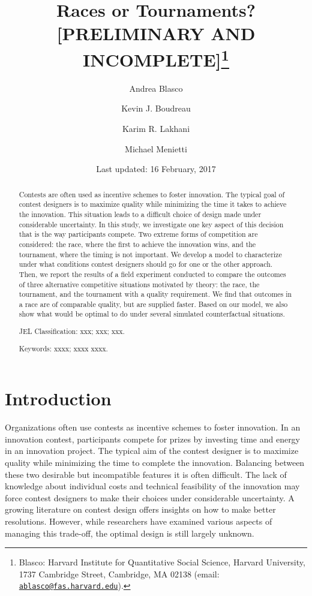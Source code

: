 \documentclass[12pt,]{article}
\title{Races or Tournaments? {[}PRELIMINARY AND INCOMPLETE{]}\thanks{Blasco: Harvard Institute for Quantitative Social Science, Harvard
University, 1737 Cambridge Street, Cambridge, MA 02138 (email:
\href{mailto:ablasco@fas.harvard.edu}{\nolinkurl{ablasco@fas.harvard.edu}}).}}
\author{Andrea Blasco \and Kevin J. Boudreau \and Karim R. Lakhani \and Michael Menietti}
\date{Last updated: 16 February, 2017}
\begin{document}
\maketitle
\begin{abstract}
Contests are often used as incentive schemes to foster innovation. The
typical goal of contest designers is to maximize quality while
minimizing the time it takes to achieve the innovation. This situation
leads to a difficult choice of design made under considerable
uncertainty. In this study, we investigate one key aspect of this
decision that is the way participants compete. Two extreme forms of
competition are considered: the race, where the first to achieve the
innovation wins, and the tournament, where the timing is not important.
We develop a model to characterize under what conditions contest
designers should go for one or the other approach. Then, we report the
results of a field experiment conducted to compare the outcomes of three
alternative competitive situations motivated by theory: the race, the
tournament, and the tournament with a quality requirement. We find that
outcomes in a race are of comparable quality, but are supplied faster.
Based on our model, we also show what would be optimal to do under
several simulated counterfactual situations.

\smallskip\noindent 
JEL Classification: xxx; xxx; xxx.

\smallskip\noindent 
Keywords: xxxx; xxxx xxxx.
\end{abstract}


\clearpage
\tableofcontents
\setcounter{tocdepth}{2}
\clearpage

\section{Introduction}\label{introduction}

Organizations often use contests as incentive schemes to foster
innovation. In an innovation contest, participants compete for prizes by
investing time and energy in an innovation project. The typical aim of
the contest designer is to maximize quality while minimizing the time to
complete the innovation. Balancing between these two desirable but
incompatible features it is often difficult. The lack of knowledge about
individual costs and technical feasibility of the innovation may force
contest designers to make their choices under considerable uncertainty.
A growing literature on contest design offers insights on how to make
better resolutions. However, while researchers have examined various
aspects of managing this trade-off, the optimal design is still largely
unknown.
\end{document}

